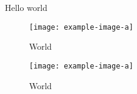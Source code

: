 \documentclass{article}
\begin{document}
\begin{framed}
  Hello world
  \begin{figure}
    \centering
    \texttt{[image: example-image-a]}
    \caption{World}
  \end{figure}
\end{framed}


\begin{figure}
  \centering
  \texttt{[image: example-image-a]}
  \caption{World}
\end{figure}
\end{document}
